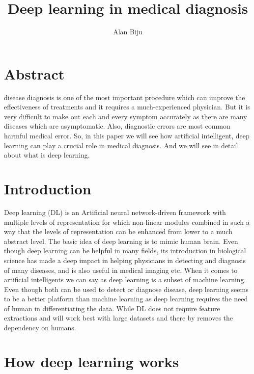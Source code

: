\documentclass{article}
\begin{document}
\title{Deep learning in medical diagnosis }
\author{Alan Biju}


\maketitle


\section*{Abstract}

disease diagnosis is one of the most important procedure which can improve the effectiveness of treatments and it requires a much-experienced physician. But it is very difficult to make out each and every symptom accurately as there are many diseases which are asymptomatic. Also, diagnostic errors are most common harmful medical error. So, in this paper we will see how artificial intelligent, deep learning can play a crucial role in medical diagnosis. And we will see in detail about what is deep learning. 



\section*{Introduction}


Deep learning (DL) is an Artificial neural network-driven framework with multiple levels of representation for which non-linear modules combined in such a way that the levels of representation can be enhanced from lower to a much abstract level. The basic idea of deep learning is to mimic human brain. Even though deep learning can be helpful in many fields, its introduction in biological science has made a deep impact in helping physicians in detecting and diagnosis of many diseases, and is also useful in medical imaging etc. When it comes to artificial intelligents we can say as deep learning is a subset of machine learning. Even though both can be used to detect or diagnose disease, deep learning seems to be a better platform than machine learning as deep learning requires the need of human in differentiating the data. While DL does not require feature extractions and will work best with large datasets and there by removes the dependency on humans. 


 \section* {How deep learning works }
\end{document}
